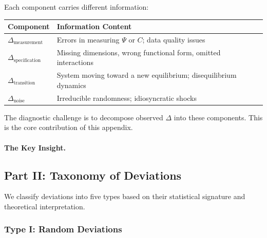 Each component carries different information:

\begin{center}
\renewcommand{\arraystretch}{1.3}
\begin{tabular}{|l|p{8cm}|}
\hline
\textbf{Component} & \textbf{Information Content} \\
\hline
$\Delta_{\text{measurement}}$ & Errors in measuring $\Psi$ or $C$; data quality issues \\
$\Delta_{\text{specification}}$ & Missing dimensions, wrong functional form, omitted interactions \\
$\Delta_{\text{transition}}$ & System moving toward a new equilibrium; disequilibrium dynamics \\
$\Delta_{\text{noise}}$ & Irreducible randomness; idiosyncratic shocks \\
\hline
\end{tabular}
\end{center}

The diagnostic challenge is to decompose observed $\Delta$ into these components. 
This is the core contribution of this appendix.

\paragraph{The Key Insight.}
\begin{center}
\end{center}

\subsection{Part II: Taxonomy of Deviations}

We classify deviations into five types based on their statistical signature 
and theoretical interpretation.

\subsubsection{Type I: Random Deviations}

